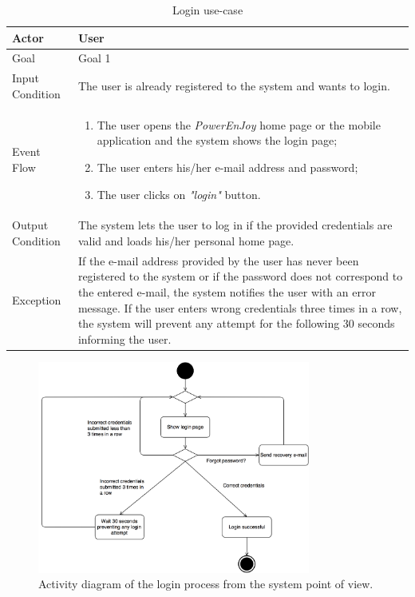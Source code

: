 \begin{table}[H]
\begin{center}
\begin{tabular}{p{} | p{}}
\hline
Actor & User\\
\hline
Goal & Goal 1\\
\hline
Input Condition & The user is already registered to the system and wants to login.\\
\hline
Event Flow & 
\begin{enumerate}
\item The user opens the \emph{PowerEnJoy} home page or the mobile application and the system shows the login page;
\item The user enters his/her e-mail address and password;
\item The user clicks on \emph{"login"} button.
\end{enumerate} \\
\hline
Output Condition & The system lets the user to log in if the provided credentials are valid and loads his/her personal home page.\\
\hline
Exception & 
If the e-mail address provided by the user has never been registered to the system or if the password does not correspond to the entered e-mail, the system notifies the user with an error message. If the user enters wrong credentials three times in a row, the system will prevent any attempt for the following 30 seconds informing the user.\\
\hline
\end{tabular}
\end{center}
\caption{Login use-case}
\label{login_uc}
\end{table}

\begin{figure}[H]
\begin{center}
		\includegraphics[width=0.8\textwidth]{./specific_requirements/features/diagrams/login_activity.png}
		\caption{Activity diagram of the login process from the system point of view.}
		\label{login_act}
\end{center}
\end{figure}


